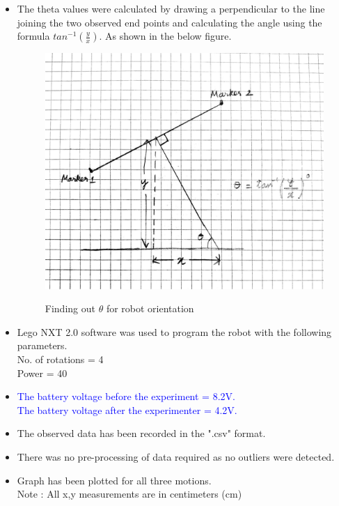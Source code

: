 \documentclass[11pt,a4paper]{article}
\begin{document}
\begin{itemize}
		\item The theta values were calculated by drawing a perpendicular to the line joining the two observed end points and calculating the angle using the formula $tan^{-1}(\frac{y}{x})$. As shown in the below figure.
		\begin{figure}[H]
			\centering	
			\includegraphics[width=1.2\linewidth]{theta_calc.jpeg}
			\label{fig:theta_calc}
			\caption{Finding out $\theta$ for robot orientation}
		\end{figure}
		\item Lego NXT 2.0 software was used to program the robot with the following parameters.\\
		No. of rotations = 4\\ 
		Power = 40
		\item \textcolor{blue}{The battery voltage before the experiment = 8.2V. \\ The battery voltage after the experimenter = 4.2V.}
		\item The observed data has been recorded in the ".csv" format.
		\item There was no pre-processing of data required as no outliers were detected.
		\item Graph has been plotted for all three motions. \\
		Note : All x,y measurements are in centimeters (cm)

\end{itemize}
\end{document}
